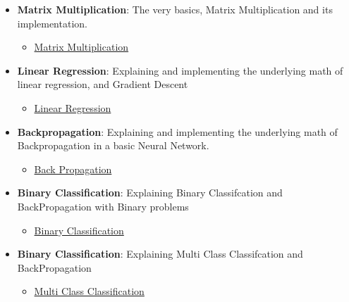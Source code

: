 \documentclass{article}
\begin{document}
\begin{itemize}
    \item \textbf{Matrix Multiplication}: The very basics, Matrix Multiplication and its implementation.
    \begin{itemize}
        \item \href{/notebooks/StartingFromTheBasicsMatrixMultiplication.ipynb}{Matrix Multiplication}
    \end{itemize}
        \item \textbf{Linear Regression}: Explaining and implementing the underlying math of linear regression, and Gradient Descent
    \begin{itemize}
        \item \href{/notebooks/StartingFromTheBasicsLinearRegression.ipynb}{Linear Regression}
    \end{itemize}
    \item \textbf{Backpropagation}: Explaining and implementing the underlying math of Backpropagation in a basic Neural Network.
    \begin{itemize}
        \item \href{/notebooks/StartingFromTheBasicsBackPropagation.ipynb}{Back Propagation}
    \end{itemize}
    \item \textbf{Binary Classification}: Explaining Binary Classifcation and BackPropagation with Binary problems
    \begin{itemize}
        \item \href{/notebooks/StartingFromTheBasicsBinaryClassification.ipynb}{Binary Classification}
    \end{itemize}
    \item \textbf{Binary Classification}: Explaining Multi Class Classifcation and BackPropagation
    \begin{itemize}
        \item \href{StartingFromTheBasicsMultiClassClassification.ipynb}{Multi Class Classification}
    \end{itemize}
\end{itemize}
\end{document}
